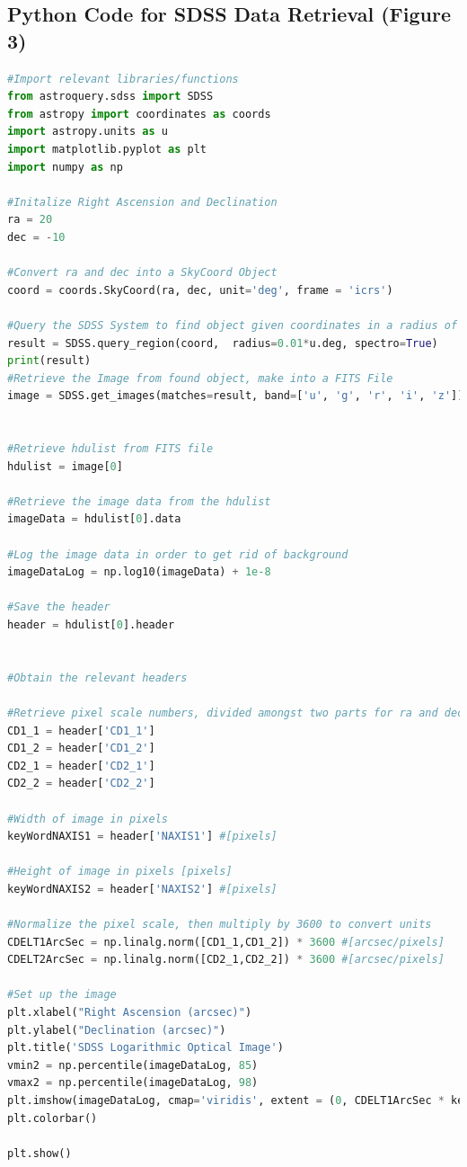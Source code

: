 \documentclass[preprint,linenumbers, longauthor]{aastex631}
\begin{document}
\begin{appendices}

\section{Python Code for SDSS Data Retrieval (Figure 3)}
\label{Appendix}
\begin{lstlisting}[language=Python]
#Import relevant libraries/functions
from astroquery.sdss import SDSS
from astropy import coordinates as coords
import astropy.units as u
import matplotlib.pyplot as plt
import numpy as np

#Initalize Right Ascension and Declination
ra = 20
dec = -10

#Convert ra and dec into a SkyCoord Object
coord = coords.SkyCoord(ra, dec, unit='deg', frame = 'icrs')

#Query the SDSS System to find object given coordinates in a radius of 0.01 degrees
result = SDSS.query_region(coord,  radius=0.01*u.deg, spectro=True)
print(result)
#Retrieve the Image from found object, make into a FITS File
image = SDSS.get_images(matches=result, band=['u', 'g', 'r', 'i', 'z'])


#Retrieve hdulist from FITS file
hdulist = image[0]

#Retrieve the image data from the hdulist 
imageData = hdulist[0].data

#Log the image data in order to get rid of background
imageDataLog = np.log10(imageData) + 1e-8

#Save the header
header = hdulist[0].header


#Obtain the relevant headers

#Retrieve pixel scale numbers, divided amongst two parts for ra and dec 
CD1_1 = header['CD1_1']
CD1_2 = header['CD1_2']
CD2_1 = header['CD2_1']
CD2_2 = header['CD2_2']

#Width of image in pixels 
keyWordNAXIS1 = header['NAXIS1'] #[pixels]

#Height of image in pixels [pixels]
keyWordNAXIS2 = header['NAXIS2'] #[pixels]

#Normalize the pixel scale, then multiply by 3600 to convert units
CDELT1ArcSec = np.linalg.norm([CD1_1,CD1_2]) * 3600 #[arcsec/pixels]
CDELT2ArcSec = np.linalg.norm([CD2_1,CD2_2]) * 3600 #[arcsec/pixels]

#Set up the image
plt.xlabel("Right Ascension (arcsec)")
plt.ylabel("Declination (arcsec)")
plt.title('SDSS Logarithmic Optical Image')
vmin2 = np.percentile(imageDataLog, 85) 
vmax2 = np.percentile(imageDataLog, 98)
plt.imshow(imageDataLog, cmap='viridis', extent = (0, CDELT1ArcSec * keyWordNAXIS1, 0, CDELT2ArcSec * keyWordNAXIS2), vmin = vmin2, vmax = vmax2)
plt.colorbar()

plt.show()
\end{lstlisting}

\end{appendices}



\end{document}
